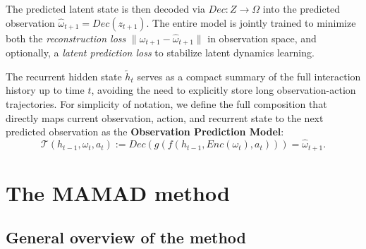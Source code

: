\documentclass[pdflatex,sn-mathphys-num]{sn-jnl}%
\theoremstyle{thmstyleone}%
\theoremstyle{thmstyletwo}%
\theoremstyle{thmstylethree}%
\begin{document}
The predicted latent state is then decoded via $Dec: Z \rightarrow \Omega$ into the predicted observation $\hat{\omega}_{t+1} = Dec(z_{t+1})$. The entire model is jointly trained to minimize both the \emph{reconstruction loss} $\|\omega_{t+1} - \hat{\omega}_{t+1}\|$ in observation space, and optionally, a \emph{latent prediction loss} to stabilize latent dynamics learning.

The recurrent hidden state $\tilde{h}_t$ serves as a compact summary of the full interaction history up to time $t$, avoiding the need to explicitly store long observation-action trajectories.
For simplicity of notation, we define the full composition that directly maps current observation, action, and recurrent state to the next predicted observation as the \textbf{Observation Prediction Model}:
\[
    \mathcal{T}(h_{t-1}, \omega_t, a_t) := Dec(g(f(h_{t-1}, Enc(\omega_t), a_t))) = \hat{\omega}_{t+1}.
\]



\section{The MAMAD method}\label{sec:mamad}

\subsection{General overview of the method}
\end{document}
